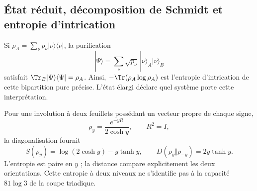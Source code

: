 

\subsection{État réduit, décomposition de Schmidt et entropie d'intrication}
Si $\rho_A=\sum_\nu p_\nu|\nu\rangle\langle\nu|$,
la purification
\[
|\Psi\rangle=\sum_\nu\sqrt{p_\nu}\,
|\nu\rangle_A|\nu\rangle_B
\]
satisfait $\Tr_B|\Psi\rangle\langle\Psi|=\rho_A$.
Ainsi, $-\Tr(\rho_A\log\rho_A)$ est l'entropie d'intrication
de cette bipartition pure précise. L'état élargi déclare
quel système porte cette interprétation.

Pour une involution à deux feuillets possédant un vecteur propre de chaque signe,
\[
\rho_y=\frac{e^{-yR}}{2\cosh y},\qquad R^2=I,
\]
la diagonalisation fournit
\[
S(\rho_y)=\log(2\cosh y)-y\tanh y,\qquad
D(\rho_y\Vert\rho_{-y})=2y\tanh y.
\]
L'entropie est paire en $y$ ; la distance compare explicitement
les deux orientations. Cette entropie à deux niveaux ne s'identifie pas
à la capacité $81\log3$ de la coupe triadique.
